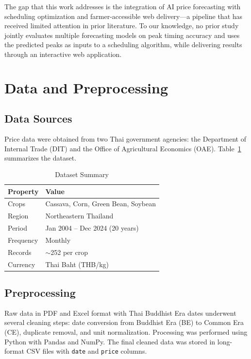 \documentclass[journal]{IEEEtran}
\begin{document}
The gap that this work addresses is the integration of AI price forecasting with scheduling optimization and farmer-accessible web delivery---a pipeline that has received limited attention in prior literature. To our knowledge, no prior study jointly evaluates multiple forecasting models on peak timing accuracy and uses the predicted peaks as inputs to a scheduling algorithm, while delivering results through an interactive web application.

\newpage
\section{Data and Preprocessing}
\label{sec:data}

\subsection{Data Sources}

Price data were obtained from two Thai government agencies: the Department of Internal Trade (DIT) and the Office of Agricultural Economics (OAE). Table~\ref{tab:dataset} summarizes the dataset.

\begin{table}[htbp]
  \centering
  \caption{Dataset Summary}
  \label{tab:dataset}
  \begin{tabular}{ll}
    \toprule
    \textbf{Property} & \textbf{Value} \\
    \midrule
    Crops & Cassava, Corn, Green Bean, Soybean \\
    Region & Northeastern Thailand \\
    Period & Jan 2004 -- Dec 2024 (20 years) \\
    Frequency & Monthly \\
    Records & $\sim$252 per crop \\
    Currency & Thai Baht (THB/kg) \\
    \bottomrule
  \end{tabular}
\end{table}

\subsection{Preprocessing}

Raw data in PDF and Excel format with Thai Buddhist Era dates underwent several cleaning steps: date conversion from Buddhist Era (BE) to Common Era (CE), duplicate removal, and unit normalization. Processing was performed using Python with Pandas and NumPy. The final cleaned data was stored in long-format CSV files with \texttt{date} and \texttt{price} columns.
\end{document}

